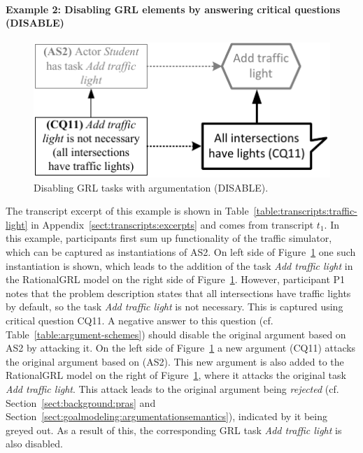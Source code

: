 \paragraph{Example 2: Disabling GRL elements by answering critical questions (\textsf{DISABLE)}}

\begin{figure}[b]
\centering
\includegraphics[]{img/fig_example_disable.pdf}
\caption{Disabling GRL tasks with argumentation (\textsf{DISABLE)}.}
\label{fig:example_disable}
\end{figure}

The transcript excerpt of this example is shown in Table~\ref{table:transcripts:traffic-light} in Appendix~\ref{sect:transcripts:excerpts} and comes from transcript $t_1$. In this example, participants first sum up functionality of the traffic simulator, which can be captured as instantiations of AS2. On left side of Figure~\ref{fig:example_disable} one such instantiation is shown, which leads to the addition of the task \emph{Add traffic light} in the RationalGRL model on the right side of Figure~\ref{fig:example_disable}. However, participant P1 notes that the problem description states that all intersections have traffic lights by default, so the task \emph{Add traffic light} is not necessary. This is captured using critical question CQ11. A negative answer to this question (cf. Table~\ref{table:argument-schemes}) should disable the original argument based on AS2 by attacking it. On the left side of Figure~\ref{fig:example_disable} a new argument (CQ11) attacks the original argument based on (AS2). This new argument is also added to the RationalGRL model on the right of Figure~\ref{fig:example_disable}, where it attacks the original task \emph{Add traffic light}. This attack leads to the original argument being \emph{rejected} (cf. Section~\ref{sect:background:pras} and Section~\ref{sect:goalmodeling:argumentationsemantics}), indicated by it being greyed out. As a result of this, the corresponding GRL task \emph{Add traffic light} is also disabled. 

